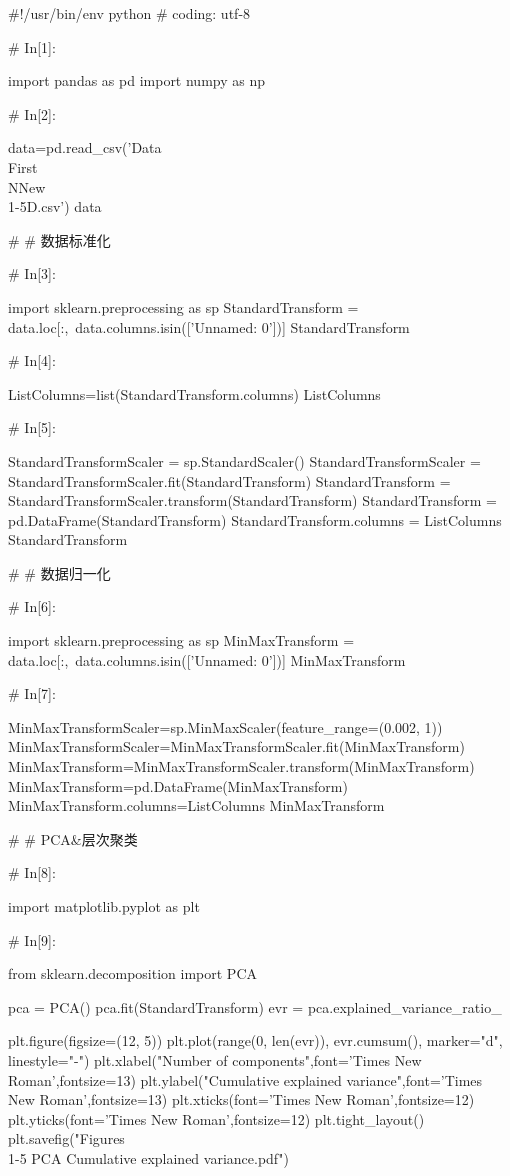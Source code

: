 \documentclass{MathorCupModeling}
\begin{document}
\begin{python}
#!/usr/bin/env python
# coding: utf-8

# In[1]:


import pandas as pd
import numpy as np


# In[2]:


data=pd.read_csv('Data\\First\\NNew\\1-5D.csv')
data


# # 数据标准化

# In[3]:


import sklearn.preprocessing as sp
StandardTransform = data.loc[:,~data.columns.isin(['Unnamed: 0'])]
StandardTransform


# In[4]:


ListColumns=list(StandardTransform.columns)
ListColumns


# In[5]:


StandardTransformScaler = sp.StandardScaler()
StandardTransformScaler = StandardTransformScaler.fit(StandardTransform)
StandardTransform = StandardTransformScaler.transform(StandardTransform)
StandardTransform = pd.DataFrame(StandardTransform)
StandardTransform.columns = ListColumns
StandardTransform


# # 数据归一化

# In[6]:


import sklearn.preprocessing as sp
MinMaxTransform = data.loc[:,~data.columns.isin(['Unnamed: 0'])]
MinMaxTransform


# In[7]:


MinMaxTransformScaler=sp.MinMaxScaler(feature_range=(0.002, 1))
MinMaxTransformScaler=MinMaxTransformScaler.fit(MinMaxTransform)
MinMaxTransform=MinMaxTransformScaler.transform(MinMaxTransform)
MinMaxTransform=pd.DataFrame(MinMaxTransform)
MinMaxTransform.columns=ListColumns
MinMaxTransform


# # PCA&层次聚类

# In[8]:


import matplotlib.pyplot as plt


# In[9]:


from sklearn.decomposition import PCA

pca = PCA()
pca.fit(StandardTransform)
evr = pca.explained_variance_ratio_

plt.figure(figsize=(12, 5))
plt.plot(range(0, len(evr)), evr.cumsum(), marker="d", linestyle="-")
plt.xlabel("Number of components",font='Times New Roman',fontsize=13)
plt.ylabel("Cumulative explained variance",font='Times New Roman',fontsize=13)
plt.xticks(font='Times New Roman',fontsize=12)
plt.yticks(font='Times New Roman',fontsize=12)
plt.tight_layout()
plt.savefig("Figures\\1-5 PCA Cumulative explained variance.pdf")



\end{python}
\end{document}
